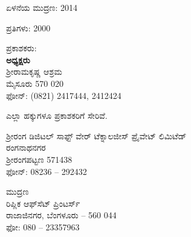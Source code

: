 \thispagestyle{empty}

\begin{flushleft}
ಏಳನೆಯ ಮುದ್ರಣ: 2014
\end{flushleft}

\vfill

\begin{flushleft}
ಪ್ರತಿಗಳು: 2000
\end{flushleft}

\vfill

\begin{flushleft}
ಪ್ರಕಾಶಕರು:\\\textbf{ಅಧ್ಯಕ್ಷರು}\\ಶ‍್ರೀರಾಮಕೃಷ್ಣ ಆಶ್ರಮ\\ ಮೈಸೂರು 570 020\\ಫೋನ್​: (0821) 2417444, 2412424
\end{flushleft}

\vfill

\begin{flushleft}
 ಎಲ್ಲಾ ಹಕ್ಕುಗಳೂ ಪ್ರಕಾಶಕರಿಗೆ ಸೇರಿವೆ.
\end{flushleft}

\vfill

\begin{flushleft}
ಶ‍್ರೀರಂಗ ಡಿಜಿಟಲ್ ಸಾಫ್ಟ್ ‍ವೇರ್ ಟೆಕ್ನಾಲಜೀಸ್ ಪ್ರೈವೇಟ್ ಲಿಮಿಟೆಡ್\\ರಂಗನಾಥನಗರ\\ಶ‍್ರೀರಂಗಪಟ್ಟಣ 571438\\ಫೋನ್​: 08236 – 292432
\end{flushleft}

\vfill

\begin{flushleft}
ಮುದ್ರಣ\\ರಿಪ್ಲಿಕ ಆಫ್‌ಸೆಟ್ ಪ್ರಿಂಟರ್ಸ್\\ರಾಜಾಜಿನಗರ, ಬೆಂಗಳೂರು – 560 044\\ಫೋ: 080 – 23357963
\end{flushleft}

